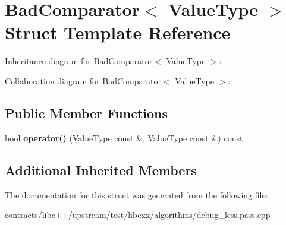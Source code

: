 \hypertarget{struct_bad_comparator}{}\section{Bad\+Comparator$<$ Value\+Type $>$ Struct Template Reference}
\label{struct_bad_comparator}


Inheritance diagram for Bad\+Comparator$<$ Value\+Type $>$\+:


Collaboration diagram for Bad\+Comparator$<$ Value\+Type $>$\+:
\subsection*{Public Member Functions}
\begin{DoxyCompactItemize}
\item 
\mbox{\label{struct_bad_comparator_a67e8e4fd1cd38b0b77bc0f504175f970}} 
bool {\bfseries operator()} (Value\+Type const \&, Value\+Type const \&) const
\end{DoxyCompactItemize}
\subsection*{Additional Inherited Members}


The documentation for this struct was generated from the following file\+:\begin{DoxyCompactItemize}
\item 
contracts/libc++/upstream/test/libcxx/algorithms/debug\+\_\+less.\+pass.\+cpp\end{DoxyCompactItemize}
